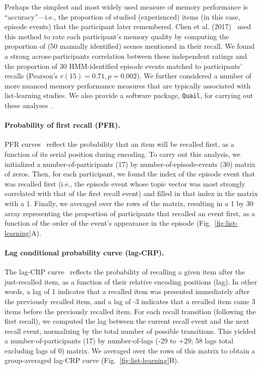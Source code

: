 \documentclass[10pt]{article}
\begin{document}
Perhaps the simplest and most widely used measure of memory performance is ``accuracy''---i.e., the proportion of studied (experienced) items (in this case, episode events) that the participant later remembered.  Chen et al. (2017)~\cite{ChenEtal17} used this method to rate each participant's memory quality by computing the proportion of (50 manually identified) scenes mentioned in their recall.  We found a strong across-participants correlation between these independent ratings and the proportion of 30 HMM-identified episode events matched to participants' recalls (Pearson's $r(15) = 0.71, p = 0.002$).  We further considered a number of more nuanced memory performance measures that are typically associated with list-learning studies.  We also provide a software package, \texttt{Quail}, for carrying out these analyses~\citep{HeusEtal17b}.

\paragraph{Probability of first recall (PFR).}  PFR curves~\citep{WelcBurn24, PostPhil65, AtkiShif68} reflect the probability that an item will be recalled first, as a function of its serial position during encoding. To carry out this analysis, we initialized a number-of-participants (17) by number-of-episode-events (30) matrix of zeros. Then, for each participant, we found the index of the episode event that was recalled first (i.e., the episode event whose topic vector was most strongly correlated with that of the first recall event) and filled in that index in the matrix with a 1.  Finally, we averaged over the rows of the matrix, resulting in a 1 by 30 array representing the proportion of participants that recalled an event first, as a function of the order of the event's appearance in the episode (Fig.~\ref{fig:list-learning}A).

\paragraph{Lag conditional probability curve (lag-CRP).} The lag-CRP curve~\citep{Kaha96} reflects the probability of recalling a given item after the just-recalled item, as a function of their relative encoding positions (lag).  In other words, a lag of 1 indicates that a recalled item was presented immediately after the previously recalled item, and a lag of -3 indicates that a recalled item came 3 items before the previously recalled item.  For each recall transition (following the first recall), we computed the lag between the current recall event and the next recall event, normalizing by the total number of possible transitions.  This yielded a number-of-participants (17) by number-of-lags (-29 to +29; 58 lags total excluding lags of 0) matrix. We averaged over the rows of this matrix to obtain a group-averaged lag-CRP curve (Fig.~\ref{fig:list-learning}B).
\end{document}
